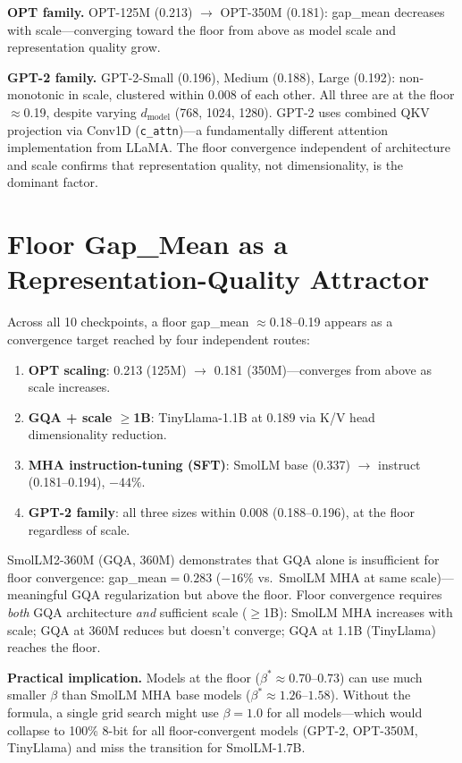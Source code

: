 \documentclass{article}
\begin{document}
\textbf{OPT family.} OPT-125M (0.213) $\to$ OPT-350M (0.181): gap\_mean decreases with
scale---converging toward the floor from above as model scale and representation quality grow.

\textbf{GPT-2 family.} GPT-2-Small (0.196), Medium (0.188), Large (0.192): non-monotonic
in scale, clustered within 0.008 of each other. All three are at the floor $\approx$0.19,
despite varying $d_\text{model}$ (768, 1024, 1280). GPT-2 uses combined QKV projection via
Conv1D (\texttt{c\_attn})---a fundamentally different attention implementation from LLaMA.
The floor convergence independent of architecture and scale confirms that representation
quality, not dimensionality, is the dominant factor.

\section{Floor Gap\_Mean as a Representation-Quality Attractor}
\label{sec:floor}

Across all 10 checkpoints, a floor gap\_mean $\approx$0.18--0.19 appears as a convergence
target reached by four independent routes:

\begin{enumerate}
\item \textbf{OPT scaling}: 0.213 (125M) $\to$ 0.181 (350M)---converges from above as scale increases.
\item \textbf{GQA + scale $\geq$1B}: TinyLlama-1.1B at 0.189 via K/V head dimensionality reduction.
\item \textbf{MHA instruction-tuning (SFT)}: SmolLM base (0.337) $\to$ instruct (0.181--0.194), $-44\%$.
\item \textbf{GPT-2 family}: all three sizes within 0.008 (0.188--0.196), at the floor regardless of scale.
\end{enumerate}

SmolLM2-360M (GQA, 360M) demonstrates that GQA alone is insufficient for floor convergence:
gap\_mean$=0.283$ ($-16\%$ vs.\ SmolLM MHA at same scale)---meaningful GQA regularization but
above the floor. Floor convergence requires \emph{both} GQA architecture \emph{and} sufficient
scale ($\geq$1B): SmolLM MHA increases with scale; GQA at 360M reduces but doesn't converge;
GQA at 1.1B (TinyLlama) reaches the floor.

\textbf{Practical implication.} Models at the floor ($\beta^* \approx 0.70$--$0.73$) can use
much smaller $\beta$ than SmolLM MHA base models ($\beta^* \approx 1.26$--$1.58$). Without
the formula, a single grid search might use $\beta{=}1.0$ for all models---which would collapse
to 100\% 8-bit for all floor-convergent models (GPT-2, OPT-350M, TinyLlama) and miss the
transition for SmolLM-1.7B.
\end{document}
